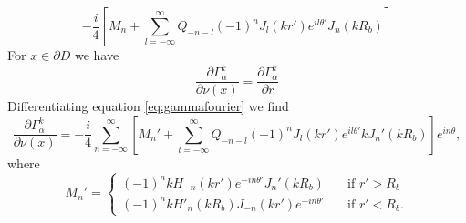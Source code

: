 \documentclass[a4paper]{article}
\theoremstyle{definition}
\begin{document}
\begin{equation*}
-\frac{i}{4}\left[M_n + \sum_{l=-\infty}^\infty Q_{-n-l} (-1)^nJ_l(kr')e^{il\theta'}J_n(kR_b)\right]
\end{equation*}
For $x\in \partial D$ we have
\begin{equation*}
\frac{\partial \Gamma_\alpha^k}{\partial \nu(x)} = \frac{\partial \Gamma_\alpha^k}{\partial r}
\end{equation*} 
Differentiating equation \ref{eq:gammafourier} we find
\begin{equation*}
\frac{\partial \Gamma_\alpha^k}{\partial \nu(x)} = -\frac{i}{4}\sum_{n=-\infty}^\infty\left[ M_n' + \sum_{l=-\infty}^\infty Q_{-n-l} (-1)^nJ_l(kr')e^{il\theta'}kJ_n'(kR_b)\right]e^{in\theta},
\end{equation*}
where
\begin{equation*}
M_n' = \begin{cases}
(-1)^nkH_{-n}(kr')e^{-in\theta'}J_n'(kR_b) \quad &\text{if } r' > R_b \\
(-1)^nkH'_{n}(kR_b)J_{-n}(kr')e^{-in\theta'} \quad &\text{if } r' < R_b.
\end{cases}
\end{equation*}


{}

\end{document}
